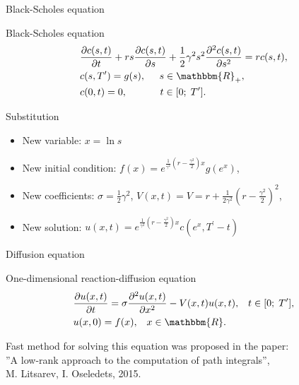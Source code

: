 \documentclass{beamer}
\theoremstyle{definition}
\theoremstyle{plain}
\theoremstyle{remark}
\begin{document}
		\begin{frame}{Black-Scholes equation}
			\vspace{-5pt}
			\begin{block}{Black-Scholes equation}
				\begin{equation}
					\begin{aligned}
						&\frac{\partial c(s,t)}{\partial t} +
						rs \frac{\partial c(s,t)}{\partial s} +
						\frac12 \gamma^2 s^2 \frac{\partial^2 c(s,t)}{\partial s^2} =
						rc(s,t),\\
						&c(s,T^{\prime}) = g(s), \;\;\;\;\; s \in \mathbbm{R}_{+},\\
						&c(0,t) = 0, \;\;\;\;\;\;\;\;\;\;\;\; t \in [0;\;T^{\prime}].
						\nonumber
					\end{aligned}
				\end{equation}
			\end{block}

			\vspace{-5pt}
			\begin{block}{Substitution}
						\begin{itemize}
							\item New variable: $x=\ln s$
							\item New initial condition: $f(x) = e^{\frac{1}{\gamma^2} (r-\frac{\gamma^2}{2})x} g(e^x)$,
							\item New coefficients: $\sigma = \frac12 \gamma^2$,
						 			$V(x,t) = V = r +  \frac{1}{2\gamma^2} \left( r-\frac{\gamma^2}{2}\right)^2$,
						 	\item New solution: $u(x,t) =  e^{\frac{1}{\gamma^2} (r-\frac{\gamma^2}{2})x} c(e^x, T^{\prime} - t)$
						\end{itemize}
			\end{block}
							
		\end{frame}

		\begin{frame}{Diffusion equation}

			\begin{block}{One-dimensional reaction-diffusion equation}
				\begin{equation}
					\begin{aligned}
						&\frac{\partial u(x,t)}{\partial t} = \sigma \frac{\partial^2 u(x,t)}{\partial x^2} - V(x,t) u(x,t),
						\;\;\; t \in [0;\;T^{\prime}],\\
						&u(x,0) = f(x), \;\;\; x \in \mathbbm{R}.
					\nonumber
					\end{aligned}
				\end{equation}
			\end{block}

			\begin{center}
				Fast method for solving this equation was proposed in the paper:\\
				''A low-rank approach to the computation of path integrals'',\\ M. Litsarev, I. Oseledets, 2015.
			\end{center}
		\end{frame}
\end{document}
